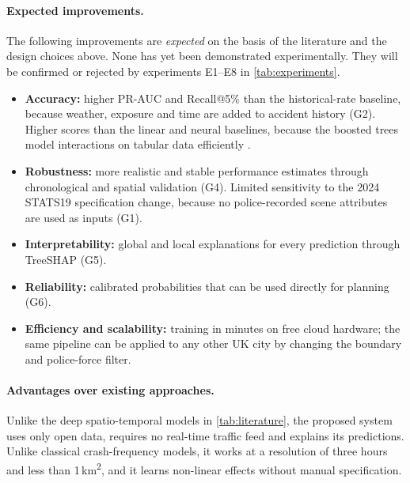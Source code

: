 \paragraph{Expected improvements.}
The following improvements are \emph{expected} on the basis of the literature and the design choices above. None has yet been demonstrated experimentally. They will be confirmed or rejected by experiments E1--E8 in \cref{tab:experiments}.
\begin{itemize}
\item \textbf{Accuracy:} higher PR-AUC and Recall@5\% than the historical-rate baseline, because weather, exposure and time are added to accident history (G2). Higher scores than the linear and neural baselines, because the boosted trees model interactions on tabular data efficiently \cite{grinsztajn2022tree}.
\item \textbf{Robustness:} more realistic and stable performance estimates through chronological and spatial validation (G4). Limited sensitivity to the 2024 STATS19 specification change, because no police-recorded scene attributes are used as inputs (G1).
\item \textbf{Interpretability:} global and local explanations for every prediction through TreeSHAP (G5).
\item \textbf{Reliability:} calibrated probabilities that can be used directly for planning (G6).
\item \textbf{Efficiency and scalability:} training in minutes on free cloud hardware; the same pipeline can be applied to any other UK city by changing the boundary and police-force filter.
\end{itemize}

\paragraph{Advantages over existing approaches.}
Unlike the deep spatio-temporal models in \cref{tab:literature}, the proposed system uses only open data, requires no real-time traffic feed and explains its predictions. Unlike classical crash-frequency models, it works at a resolution of three hours and less than 1\,km\textsuperscript{2}, and it learns non-linear effects without manual specification.

